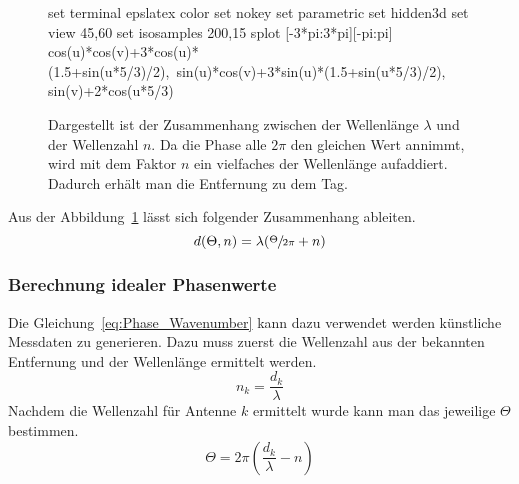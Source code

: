 \begin{figure}[h!]
	\caption[Zusammenhang Wellenlänge - Wellenzahl]{Dargestellt ist der Zusammenhang zwischen der Wellenlänge $\lambda$ und der Wellenzahl $n$. Da die Phase alle $2\pi$ den gleichen Wert annimmt, wird mit dem Faktor $n$ ein vielfaches der Wellenlänge aufaddiert. Dadurch erhält man die Entfernung zu dem Tag.}
	\label{fig:wavenumber_wavelength}
	\begin{gnuplot} %
		set terminal epslatex color %
		set nokey %
		set parametric
		set hidden3d
		set view 45,60
		set isosamples 200,15
		splot [-3*pi:3*pi][-pi:pi] cos(u)*cos(v)+3*cos(u)*(1.5+sin(u*5/3)/2),\
		sin(u)*cos(v)+3*sin(u)*(1.5+sin(u*5/3)/2), sin(v)+2*cos(u*5/3)
	\end{gnuplot}	
%	
%	
\end{figure}


Aus der Abbildung~\ref{fig:wavenumber_wavelength} lässt sich folgender Zusammenhang ableiten.
%
\begin{equation}
\label{eq:Phase_Wavenumber}
	d(\Theta, n)=\lambda(\sfrac{\Theta}{2\pi}+n)
\end{equation}
%
\subsubsection{Berechnung idealer Phasenwerte}
\label{sec:PhaseCalculation}
%
Die Gleichung~\ref{eq:Phase_Wavenumber} kann dazu verwendet werden künstliche Messdaten zu generieren. Dazu muss zuerst die Wellenzahl aus der bekannten Entfernung und der Wellenlänge ermittelt werden.
$$
n_k=\frac{d_k}{\lambda}
$$
Nachdem die Wellenzahl für Antenne $k$ ermittelt wurde kann man das jeweilige $\Theta$ bestimmen.
$$
\Theta= 2\pi(\frac{d_k }{\lambda}-n)
$$